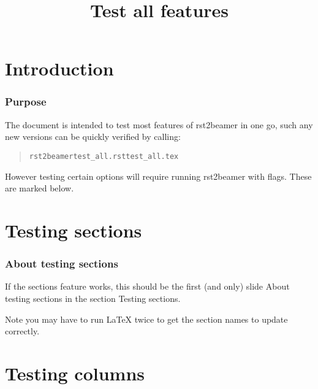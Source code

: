 \documentclass[t]{beamer}
\begin{document}
\title[Test all features]{Test all features%
  \label{test-all-features}}
\author[]{}
\date{}
\maketitle


\section{Introduction%
  \label{introduction}%
}

\begin{frame}[fragile]
\frametitle{Purpose}


The document is intended to test most features of rst2beamer in one go, such
any new versions can be quickly verified by calling:
%
\begin{quote}
\begin{alltt}
rst2beamer test_all.rst test_all.tex
\end{alltt}
\end{quote}

However testing certain options will require running rst2beamer with flags.
These are marked below.

\end{frame}


\section{Testing sections%
  \label{testing-sections}%
}

\begin{frame}[fragile]
\frametitle{About testing sections}


If the sections feature works, this should be the first (and only) slide
\textquotedbl{}About testing sections\textquotedbl{} in the section \textquotedbl{}Testing sections\textquotedbl{}.

Note you may have to run LaTeX twice to get the section names to update
correctly.

\end{frame}


\section{Testing columns%
  \label{testing-columns}%
}
\end{document}

